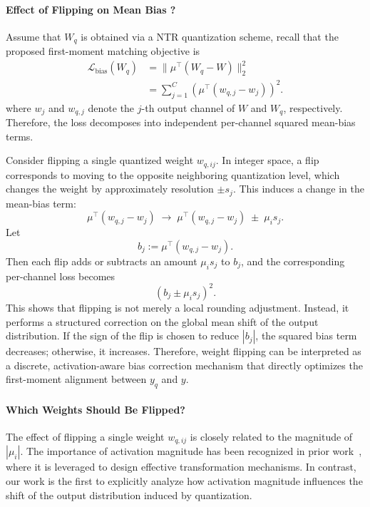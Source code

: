 \documentclass[table, 11pt]{article}
\begin{document}
\paragraph{Effect of Flipping on Mean Bias ?} Assume that $W_q$ is obtained via a NTR quantization scheme, recall that the proposed first-moment matching objective is
\begin{equation}
\begin{aligned}
\mathcal{L}_{\text{bias}}(W_q)
&=
\big\|
\mu^{\top}(W_q - W)
\big\|_2^2 \\
&=
\sum_{j=1}^{C}
\left( \mu^{\top}(w_{q,j} - w_j) \right)^2.
\end{aligned}
\end{equation}
where $w_j$ and $w_{q,j}$ denote the $j$-th output channel of $W$ and $W_q$, respectively. Therefore, the loss decomposes into independent per-channel squared mean-bias terms.

Consider flipping a single quantized weight $w_{q,ij}$. In integer space, a flip corresponds to moving to the opposite neighboring quantization level, which changes the weight by approximately resolution $\pm s_j$. This induces a change in the mean-bias term:
\begin{equation}
\mu^{\top}(w_{q,j} - w_j)
\;\longrightarrow\;
\mu^{\top}(w_{q,j} - w_j) \;\pm\; \mu_i s_j.
\end{equation}
Let
\begin{equation}
b_j := \mu^{\top}(w_{q,j} - w_j).
\label{eq:per-channel-loss}
\end{equation}
Then each flip adds or subtracts an amount $\mu_i s_j$ to $b_j$, and the
corresponding per-channel loss becomes
\begin{equation}
(b_j \pm \mu_i s_j)^2.
\label{eq:b-modify}
\end{equation}
This shows that flipping is not merely a local rounding adjustment. Instead, it performs a structured correction on the global mean shift of the output distribution. If the sign of the flip is chosen to reduce $|b_j|$, the squared bias term decreases; otherwise, it increases. Therefore, weight flipping can be interpreted as a discrete, activation-aware bias correction mechanism that directly optimizes the first-moment alignment between $y_q$ and $y$.

\paragraph{Which Weights Should Be Flipped?}
The effect of flipping a single weight $w_{q,ij}$ is closely related to the magnitude of $|\mu_i|$. The importance of activation magnitude has been recognized in prior work~\cite{smoothquant2023, flatquant2025, MLSYS2024_awq}, where it is leveraged to design effective transformation mechanisms. In contrast, our work is the first to explicitly analyze how activation magnitude influences the shift of the output distribution induced by quantization.
\end{document}
